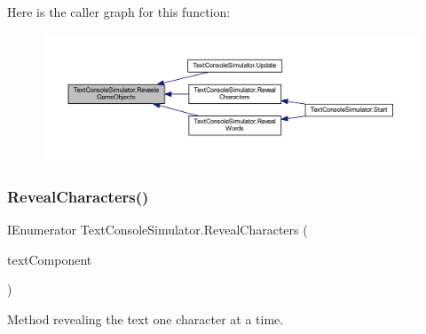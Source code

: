 Here is the caller graph for this function\+:
\nopagebreak
\begin{figure}[H]
\begin{center}
\leavevmode
\includegraphics[width=350pt]{class_text_console_simulator_ad7cf321e68b408092040fd1a6c2096cd_icgraph}
\end{center}
\end{figure}
\mbox{\label{class_text_console_simulator_a6740593a0a66d052b4bc2076b0032d96}} 
\subsubsection{\texorpdfstring{Reveal\+Characters()}{RevealCharacters()}}
{\footnotesize\ttfamily I\+Enumerator Text\+Console\+Simulator.\+Reveal\+Characters (\begin{DoxyParamCaption}\item[{T\+M\+P\+\_\+\+Text}]{text\+Component }\end{DoxyParamCaption})\hspace{0.3cm}{\ttfamily [private]}}



Method revealing the text one character at a time. 

